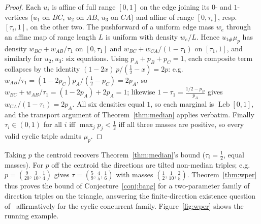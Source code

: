 \documentclass[11pt,reqno]{amsart}
\theoremstyle{plain}
\theoremstyle{definition}
\theoremstyle{remark}
\newcommand{\Leb}{\operatorname{Leb}}
\begin{document}
\begin{proof}
Each $u_i$ is affine of full range $[0,1]$ on the edge joining its $0$- and
$1$-vertices ($u_1$ on $BC$, $u_2$ on $AB$, $u_3$ on $CA$) and affine of range
$[0,\tau_i]$, resp.\ $[\tau_i,1]$, on the other two. The pushforward of a uniform
edge mass $w_e$ through an affine map of range length $L$ is uniform with density
$w_e/L$. Hence $u_{1\#}\mu_p$ has density $w_{BC}+w_{AB}/\tau_1$ on $[0,\tau_1]$ and
$w_{BC}+w_{CA}/(1-\tau_1)$ on $[\tau_1,1]$, and similarly for $u_2,u_3$: six
equations. Using $p_A+p_B+p_C=1$, each composite term collapses by the identity
$(1-2x)\,p/(\tfrac12-x)=2p$: e.g.\
$w_{AB}/\tau_1=(1-2p_C)p_A/(\tfrac12-p_C)=2p_A$, so
$w_{BC}+w_{AB}/\tau_1=(1-2p_A)+2p_A=1$; likewise
$1-\tau_1=\frac{1/2-p_B}{p_A}$ gives $w_{CA}/(1-\tau_1)=2p_A$. All six densities
equal $1$, so each marginal is $\Leb[0,1]$, and the transport argument of
Theorem~\ref{thm:median} applies verbatim. Finally $\tau_i\in(0,1)$ for all $i$ iff
$\max_jp_j<\tfrac12$ iff all three masses are positive, so every valid cyclic triple
admits $\mu_p$.
\end{proof}
Taking $p$ the centroid recovers Theorem~\ref{thm:median}'s bound ($\tau_i=\tfrac12$,
equal masses). For $p$ off the centroid the directions are tilted non-median
triples; e.g.\ $p=(\tfrac9{20},\tfrac3{10},\tfrac14)$ gives
$\tau=(\tfrac59,\tfrac45,\tfrac16)$ with masses $(\tfrac12,\tfrac1{10},\tfrac25)$.
Theorem~\ref{thm:wper} thus proves the bound of Conjecture~\ref{conj:bang} for a
two-parameter family of direction triples on the triangle, answering the
finite-direction existence question of~\cite{Gardner88} affirmatively for the cyclic
concurrent family. Figure~\ref{fig:wper} shows the running example.
\end{document}
